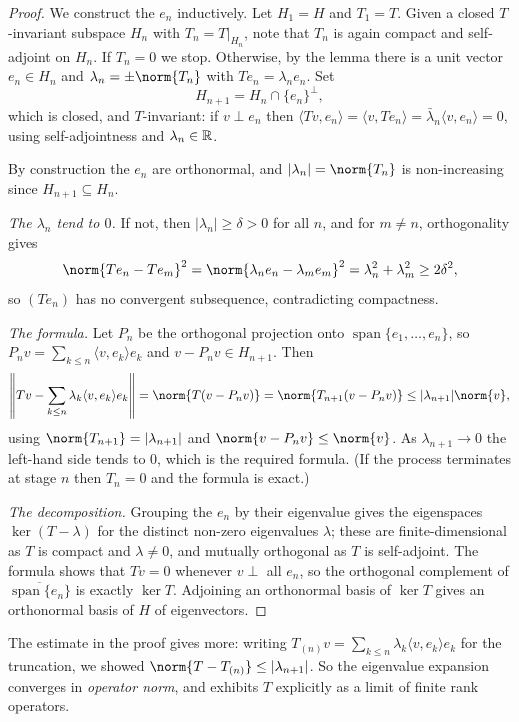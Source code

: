 \documentclass[a4paper]{scrartcl}
\newcommand{\ip}[2]{\langle #1, #2 \rangle}
\newcommand{\spn}{\operatorname{span}}
\begin{document}
\begin{proof}
	We construct the $e_n$ inductively. Let $H_1 = H$ and $T_1 = T$. Given a closed $T$-invariant subspace $H_n$ with $T_n = T|_{H_n}$, note that $T_n$ is again compact and self-adjoint on $H_n$. If $T_n = 0$ we stop. Otherwise, by the lemma there is a unit vector $e_n\in H_n$ and $\lambda_n = \pm\norm{T_n}$ with $T e_n = \lambda_ne_n$. Set
	$$H_{n+1} = H_n \cap \{e_n\}^\perp,$$
	which is closed, and $T$-invariant: if $v \perp e_n$ then $\ip{Tv}{e_n} = \ip{v}{Te_n}=\bar\lambda_n\ip{v}{e_n}=0$, using self-adjointness and $\lambda_n\in\mathbb{R}$.

	By construction the $e_n$ are orthonormal, and $|\lambda_n| = \norm{T_n}$ is non-increasing since $H_{n+1}\subseteq H_n$.

	\emph{The $\lambda_n$ tend to $0$.} If not, then $|\lambda_n|\geq\delta>0$ for all $n$, and for $m \neq n$, orthogonality gives
	$$\norm{Te_n - Te_m}^2 = \norm{\lambda_ne_n-\lambda_me_m}^2 = \lambda_n^2+\lambda_m^2\geq2\delta^2,$$
	so $(Te_n)$ has no convergent subsequence, contradicting compactness.

	\emph{The formula.} Let $P_n$ be the orthogonal projection onto $\spn\{e_1,\dots,e_n\}$, so $P_nv = \sum_{k\leq n}\ip{v}{e_k}e_k$ and $v - P_nv \in H_{n+1}$. Then
	$$\left\| Tv - \sum_{k\leq n}\lambda_k\ip{v}{e_k}e_k\right\| = \norm{T(v - P_nv)} = \norm{T_{n+1}(v-P_nv)}\leq|\lambda_{n+1}|\norm{v},$$
	using $\norm{T_{n+1}} = |\lambda_{n+1}|$ and $\norm{v - P_nv}\leq\norm{v}$. As $\lambda_{n+1}\to0$ the left-hand side tends to $0$, which is the required formula. (If the process terminates at stage $n$ then $T_{n} = 0$ and the formula is exact.)

	\emph{The decomposition.} Grouping the $e_n$ by their eigenvalue gives the eigenspaces $\ker(T-\lambda)$ for the distinct non-zero eigenvalues $\lambda$; these are finite-dimensional as $T$ is compact and $\lambda \neq 0$, and mutually orthogonal as $T$ is self-adjoint. The formula shows that $Tv = 0$ whenever $v \perp$ all $e_n$, so the orthogonal complement of $\overline{\spn\{e_n\}}$ is exactly $\ker T$. Adjoining an orthonormal basis of $\ker T$ gives an orthonormal basis of $H$ of eigenvectors.
\end{proof}

\begin{remark}
	The estimate in the proof gives more: writing $T_{(n)}v = \sum_{k\leq n}\lambda_k\ip{v}{e_k}e_k$ for the truncation, we showed $\norm{T - T_{(n)}}\leq|\lambda_{n+1}|$. So the eigenvalue expansion converges in \emph{operator norm}, and exhibits $T$ explicitly as a limit of finite rank operators.
\end{remark}
\end{document}

